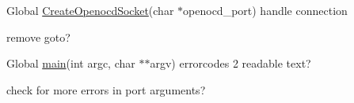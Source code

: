 \label{todo__todo000001}
\hypertarget{todo__todo000001}{}
 
\begin{DoxyDescription}
\item[Global \hyperlink{netx10__gdb__switch_8c_ad84d6b23a49846837c5d385cbfd76e7d}{CreateOpenocdSocket}(char $\ast$openocd\_\-port) ]handle connection 

remove goto? 
\end{DoxyDescription}

\label{todo__todo000003}
\hypertarget{todo__todo000003}{}
 
\begin{DoxyDescription}
\item[Global \hyperlink{netx10__gdb__switch_8c_a7626fdc5873a2d10e9ac910fa40864b2}{main}(int argc, char $\ast$$\ast$argv) ]errorcodes 2 readable text? 

check for more errors in port arguments? 
\end{DoxyDescription}